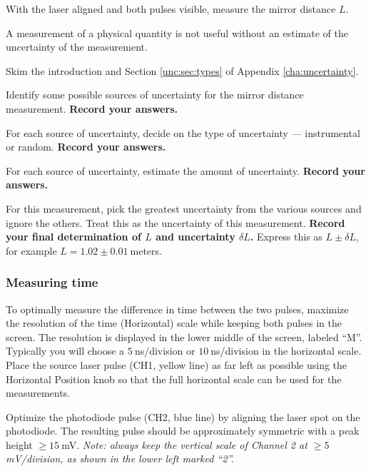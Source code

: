 \begin{steps}

	\item With the laser aligned and both pulses visible, measure the mirror distance $L$.

\end{steps}
	
A measurement of a physical quantity is not useful without an estimate of the uncertainty of the measurement.

\begin{steps}
	\item Skim the introduction and Section \ref{unc:sec:types} of Appendix \ref{cha:uncertainty}.
	
	\item Identify some possible sources of uncertainty for the mirror distance measurement. \textbf{Record your answers.}

	\item For each source of uncertainty, decide on the type of uncertainty --- instrumental or random. \textbf{Record your answers.}
	
	\item For each source of uncertainty, estimate the amount of uncertainty. \textbf{Record your answers.}
	
	\item For this measurement, pick the greatest uncertainty from the various sources and ignore the others. Treat this as the uncertainty of this measurement. \textbf{Record your final determination of $L$ and uncertainty $\delta L$.} Express this as $L \pm \delta L$, for example $L = 1.02 \pm 0.01\:$meters.

\end{steps}

\subsubsection{Measuring time}

\begin{steps}

	\item To optimally measure the difference in time between the two pulses, maximize the resolution of the time (Horizontal) scale while keeping both pulses in the screen. The resolution is displayed in the lower middle of the screen, labeled ``M''. Typically you will choose a $5\:$ns/division or $10\:$ns/division in the horizontal scale. Place the source laser pulse (CH1, yellow line) as far left as possible using the Horizontal Position knob so that the full horizontal scale can be used for the measurements.
	
	\item Optimize the photodiode pulse (CH2, blue line) by aligning the laser spot on the photodiode. The resulting pulse should be approximately symmetric with a peak height $\ge 15\:$mV. \textit{Note: always keep the vertical scale of Channel 2 at $\ge 5\:$mV/division, as shown in the lower left marked ``2''.}
	
\end{steps}

